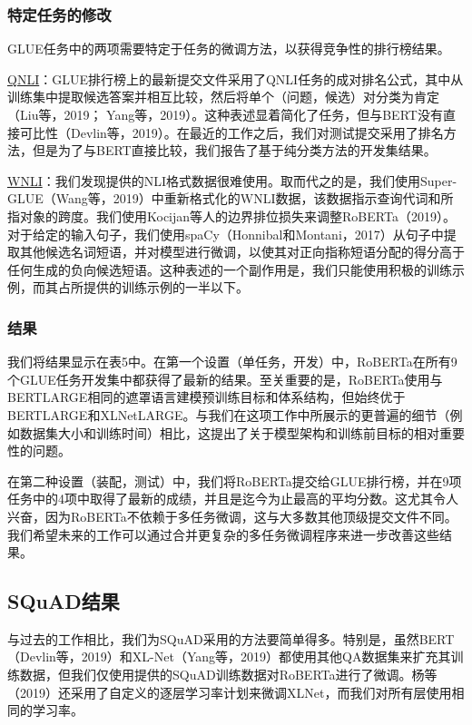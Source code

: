 \documentclass[lang=cn,11pt,a4paper,twocolumn]{elegantpaper}
\begin{document}
\subsubsection*{特定任务的修改}
GLUE任务中的两项需要特定于任务的微调方法，以获得竞争性的排行榜结果。

\underline{QNLI}：GLUE排行榜上的最新提交文件采用了QNLI任务的成对排名公式，其中从训练集中提取候选答案并相互比较，然后将单个（问题，候选）对分类为肯定（Liu等，2019； Yang等，2019）。这种表述显着简化了任务，但与BERT没有直接可比性（Devlin等，2019）。在最近的工作之后，我们对测试提交采用了排名方法，但是为了与BERT直接比较，我们报告了基于纯分类方法的开发集结果。

\underline{WNLI}：我们发现提供的NLI格式数据很难使用。取而代之的是，我们使用Super-GLUE（Wang等，2019）中重新格式化的WNLI数据，该数据指示查询代词和所指对象的跨度。我们使用Kocijan等人的边界排位损失来调整RoBERTa（2019）。对于给定的输入句子，我们使用spaCy（Honnibal和Montani，2017）从句子中提取其他候选名词短语，并对模型进行微调，以使其对正向指称短语分配的得分高于任何生成的负向候选短语。这种表述的一个副作用是，我们只能使用积极的训练示例，而其占所提供的训练示例的一半以下。

\subsubsection*{结果}
我们将结果显示在表5中。在第一个设置（单任务，开发）中，RoBERTa在所有9个GLUE任务开发集中都获得了最新的结果。至关重要的是，RoBERTa使用与BERTLARGE相同的遮罩语言建模预训练目标和体系结构，但始终优于BERTLARGE和XLNetLARGE。与我们在这项工作中所展示的更普遍的细节（例如数据集大小和训练时间）相比，这提出了关于模型架构和训练前目标的相对重要性的问题。

在第二种设置（装配，测试）中，我们将RoBERTa提交给GLUE排行榜，并在9项任务中的4项中取得了最新的成绩，并且是迄今为止最高的平均分数。这尤其令人兴奋，因为RoBERTa不依赖于多任务微调，这与大多数其他顶级提交文件不同。我们希望未来的工作可以通过合并更复杂的多任务微调程序来进一步改善这些结果。

\subsection{SQuAD结果}
与过去的工作相比，我们为SQuAD采用的方法要简单得多。特别是，虽然BERT（Devlin等，2019）和XL-Net（Yang等，2019）都使用其他QA数据集来扩充其训练数据，但我们仅使用提供的SQuAD训练数据对RoBERTa进行了微调。杨等（2019）还采用了自定义的逐层学习率计划来微调XLNet，而我们对所有层使用相同的学习率。
\end{document}
